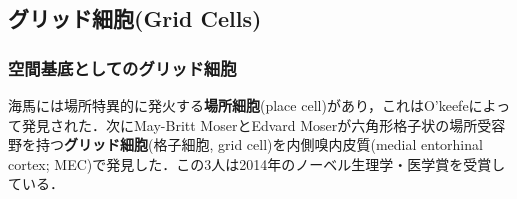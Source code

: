 \subsection{グリッド細胞(Grid Cells)}

\subsubsection{空間基底としてのグリッド細胞}
海馬には場所特異的に発火する\textbf{場所細胞}(place cell)があり，これはO'keefeによって発見された．次にMay-Britt MoserとEdvard Moserが六角形格子状の場所受容野を持つ\textbf{グリッド細胞}(格子細胞, grid cell)を内側嗅内皮質(medial entorhinal cortex; MEC)で発見した．この3人は2014年のノーベル生理学・医学賞を受賞している．
